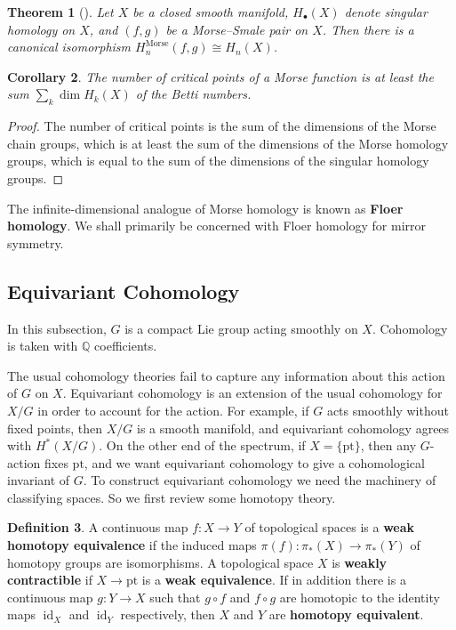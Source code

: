 \documentclass{report}
\theoremstyle{plain}
\newtheorem{theorem}{Theorem}[section]
\newtheorem{corollary}[theorem]{Corollary}
\theoremstyle{definition}
\newtheorem{definition}[theorem]{Definition}
\theoremstyle{remark}
\newcommand{\bQ}{\mathbb{Q}}
\newcommand{\Morse}{\mathrm{Morse}}
\DeclareMathOperator{\id}{id}
\newcommand{\pt}{\mathrm{pt}}
\begin{document}
\begin{theorem}[{\cite[Theorem 3.1]{Hutchings2012}}]
  Let $X$ be a closed smooth manifold, $H_\bullet(X)$ denote singular
  homology on $X$, and $(f, g)$ be a Morse--Smale pair on $X$. Then
  there is a canonical isomorphism $H_n^\Morse(f, g) \cong H_n(X)$.
\end{theorem}

\begin{corollary}
  The number of critical points of a Morse function is at least the
  sum $\sum_k \dim H_k(X)$ of the Betti numbers.
\end{corollary}

\begin{proof}
  The number of critical points is the sum of the dimensions of the
  Morse chain groups, which is at least the sum of the dimensions of
  the Morse homology groups, which is equal to the sum of the
  dimensions of the singular homology groups.
\end{proof}

The infinite-dimensional analogue of Morse homology is known as {\bf
  Floer homology}. We shall primarily be concerned with Floer homology
for mirror symmetry.

\subsection{Equivariant Cohomology}

In this subsection, $G$ is a compact Lie group acting smoothly on $X$.
Cohomology is taken with $\bQ$ coefficients.

The usual cohomology theories fail to capture any information about
this action of $G$ on $X$. Equivariant cohomology is an extension of
the usual cohomology for $X/G$ in order to account for the action. For
example, if $G$ acts smoothly without fixed points, then $X/G$ is a
smooth manifold, and equivariant cohomology agrees with $H^*(X/G)$. On
the other end of the spectrum, if $X = \{\pt\}$, then any $G$-action
fixes $\pt$, and we want equivariant cohomology to give a
cohomological invariant of $G$. To construct equivariant cohomology we
need the machinery of classifying spaces. So we first review some
homotopy theory.

\begin{definition}
  A continuous map $f\colon X \to Y$ of topological spaces is a {\bf
    weak homotopy equivalence} if the induced maps $\pi(f)\colon
  \pi_*(X) \to \pi_*(Y)$ of homotopy groups are isomorphisms. A
  topological space $X$ is {\bf weakly contractible} if $X \to \pt$ is
  a {\bf weak equivalence}. If in addition there is a continuous map
  $g\colon Y \to X$ such that $g \circ f$ and $f \circ g$ are
  homotopic to the identity maps $\id_X$ and $\id_Y$ respectively,
  then $X$ and $Y$ are {\bf homotopy equivalent}.
\end{definition}
\end{document}
